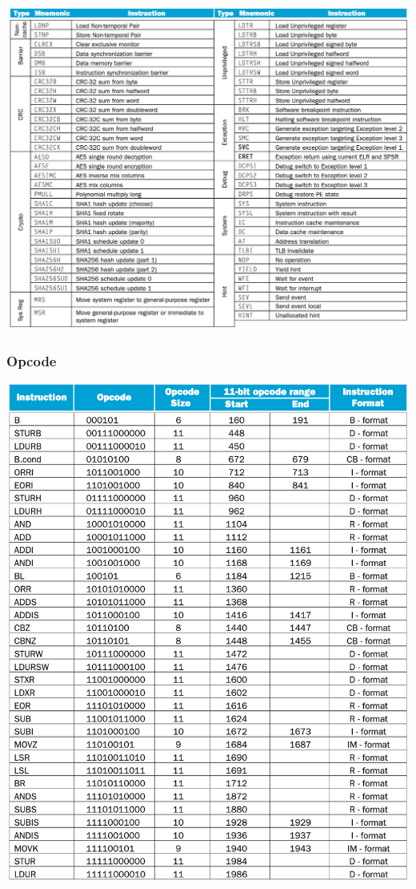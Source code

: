 \documentclass[a4paper]{scrartcl}
\begin{document}
        \centering\includegraphics[scale=0.26]{arm_assembler4}
        \subsubsection{Opcode}
        \centering\includegraphics[scale=0.26]{opcode.png}
\end{document}

